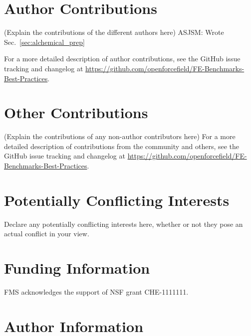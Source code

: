 \documentclass[9pt,bestpractices]{livecoms}
\newcommand{\githubrepository}{\url{https://github.com/openforcefield/FE-Benchmarks-Best-Practices}}  %
\begin{document}
\section{Author Contributions}
%

(Explain the contributions of the different authors here)
ASJSM: Wrote Sec.~\ref{sec:alchemical_prep}


For a more detailed description of author contributions,
see the GitHub issue tracking and changelog at \githubrepository.

\section{Other Contributions}
%

(Explain the contributions of any non-author contributors here)
For a more detailed description of contributions from the community and others, see the GitHub issue tracking and changelog at \githubrepository.

\section{Potentially Conflicting Interests}

Declare any potentially conflicting interests here, whether or not they pose an actual conflict in your view.

\section{Funding Information}
FMS acknowledges the support of NSF grant CHE-1111111.

\section*{Author Information}
\makeorcid




\end{document}
